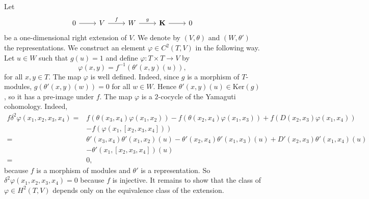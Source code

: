 \documentclass[11pt, twoside]{article}
\begin{document}
Let \[\begin{tikzcd}
	0 & V & W & {\mathbf{K}} & 0
	\arrow[from=1-1, to=1-2]
	\arrow["f", from=1-2, to=1-3]
	\arrow["g", from=1-3, to=1-4]
	\arrow[from=1-4, to=1-5]
\end{tikzcd}\] be a one-dimensional right extension of $V$. We denote by $(V,\theta) $ and $(W,\theta') $ the representations. We construct an element $\varphi\in C^2(T,V) $ in the following way. Let $u\in W$ such that $g(u)=1 $ and define $\varphi:T\times T\to V$ by $$\varphi(x,y)= f^{-1}(\theta'(x,y)(u)), $$ for all $x,y\in T$. The map $\varphi $ is well defined. Indeed, since  $g$ is a morphism of $T$-modules, $g(\theta'(x,y)(w))=0 $ for all $w\in W$. Hence $\theta'(x,y)(u)\in \mathrm{Ker}(g)$, so it has a pre-image under $f$. The map $\varphi$ is a $2$-cocycle of the Yamaguti cohomology. Indeed, \begin{align*}
    f\delta^2 \varphi(x_1,x_2,x_3,x_4)= &f(\theta (x_3,x_4)\varphi(x_1,x_2)) - f(\theta(x_2,x_4)\varphi(x_1,x_3)) + f(D(x_2,x_3)\varphi(x_1,x_4))\\ &- f(\varphi(x_1,[x_2,x_3,x_4])) \\ =& \theta'(x_3,x_4)\theta'(x_1,x_2)(u)- \theta'(x_2,x_4)\theta'(x_1,x_3)(u) + D'(x_2,x_3)\theta'(x_1,x_4)(u)\\ & - \theta'(x_1,[x_2,x_3,x_4])(u) \\ =& 0, 
\end{align*} because $f$ is a morphism of modules and $\theta'$ is a representation. So $\delta^2\varphi(x_1,x_2,x_3,x_4)=0 $ because $f$ is injective. It remains to show that the class of $\varphi\in H^2(T,V)$ depends only on the equivalence class of the extension.
\end{document}
